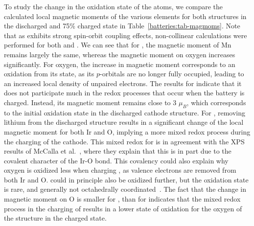 \begin{refsection}
To study the change in the oxidation state of the atoms, we compare the 
calculated local magnetic moments of the various elements for both structures 
in the discharged and 75\% charged state in Table~\ref{batteries:tab-magmoms}. 
Note that as  exhibits strong spin-orbit coupling effects, non-collinear 
calculations were performed for both  and .
We can see that for , the magnetic moment of Mn remains largely 
the same, whereas the magnetic moment on oxygen increases significantly. For 
oxygen, the increase in magnetic moment corresponds to an oxidation from its 
 state, as its $p$-orbitals are no longer fully occupied, leading 
to an increased local density of unpaired electrons. The results for  
indicate that it does not participate much in the redox processes that occur 
when the battery is charged. Instead, its magnetic moment remains close to 3 
$\mu_B$, which corresponds to the initial oxidation state  in the 
discharged cathode structure. For , removing lithium from the 
discharged structure results in a significant change of the local magnetic 
moment for both Ir and O, implying a more mixed redox process during the 
charging of the cathode. This mixed redox for  is in agreement 
with the XPS results of McCalla et al.~\cite{McCalla2015}, where they explain 
that this is in part due to the covalent character of the Ir-O bond. This 
covalency could also explain why oxygen is oxidized less when charging 
, as valence electrons are removed from both Ir and O. 
 could in principle also be oxidized further, but the  
oxidation state is rare, and generally not octahedrally 
coordinated~\cite{Saint2007}. The fact that the change in magnetic moment on O 
is smaller for , than for  indicates that the mixed 
redox process in the charging of  results in a lower state of 
oxidation for the oxygen of the structure in the charged state.  
 

\end{refsection}
